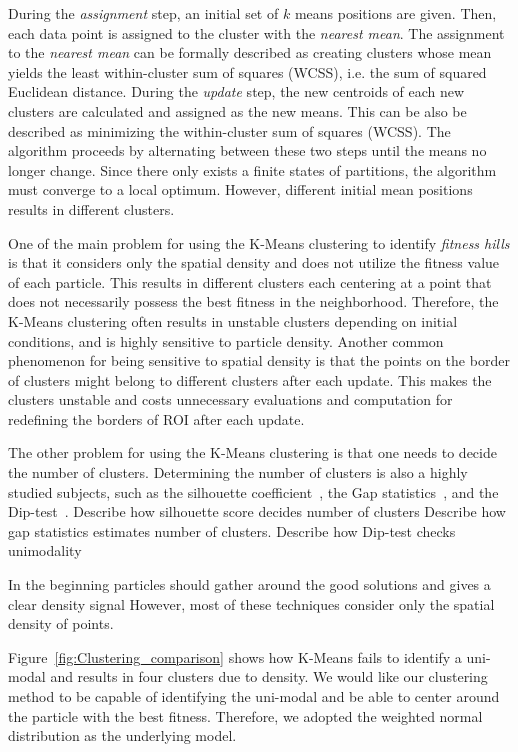 During the \textit{assignment} step, an initial set of $k$ means positions are given.
Then, each data point is assigned to the cluster with the \textit{nearest mean}.
The assignment to the \textit{nearest mean} can be formally described 
as creating clusters whose mean yields the least within-cluster sum of squares (WCSS), i.e. the sum of squared Euclidean distance.
During the \textit{update} step, the new centroids of each new clusters are calculated and assigned as the new means.
This can be also be described as minimizing the within-cluster sum of squares (WCSS).
The algorithm proceeds by alternating between these two steps until the means no longer change.
Since there only exists a finite states of partitions, the algorithm must converge to a local optimum.
However, different initial mean positions results in different clusters.

One of the main problem for using the K-Means clustering to identify \textit{fitness hills} is that
it considers only the spatial density and does not utilize the fitness value of each particle.
This results in different clusters each centering at a point that does not necessarily possess the best fitness in the neighborhood.
Therefore, the K-Means clustering often results in unstable clusters depending on initial conditions, and is highly sensitive to particle density.
Another common phenomenon for being sensitive to spatial density is that 
the points on the border of clusters might belong to different clusters after each update.
This makes the clusters unstable and costs unnecessary evaluations and computation for redefining the borders of ROI after each update. 

The other problem for using the K-Means clustering is that one needs to decide the number of clusters.
Determining the number of clusters is also a highly studied subjects, 
such as the silhouette coefficient~\cite{}, the Gap statistics~\cite{}, and the Dip-test~\cite{}.
Describe how silhouette score decides number of clusters 
Describe how gap statistics estimates number of clusters.
Describe how Dip-test checks unimodality

In the beginning particles should gather around the good solutions and gives a clear density signal
However, most of these techniques consider only the spatial density of points.




Figure~\ref{fig:Clustering_comparison} shows how K-Means fails to identify a uni-modal and results in four clusters due to density.
We would like our clustering method to be capable of identifying the uni-modal and be able to center around the particle with the best fitness.
Therefore, we adopted the weighted normal distribution as the underlying model. 


